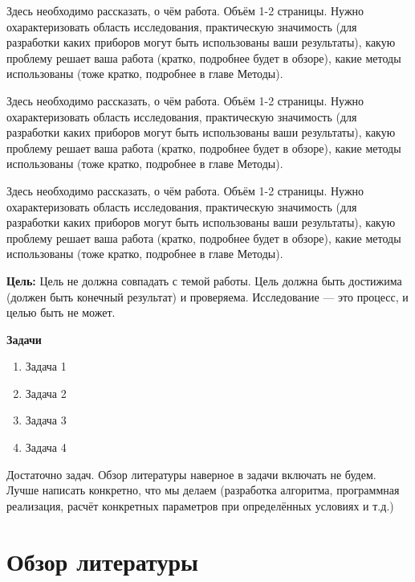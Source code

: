 \documentclass[a4paper,14pt]{extarticle}
\begin{document}


\tableofcontents
\pagebreak


Здесь необходимо рассказать, о чём работа. Объём 1-2 страницы. Нужно охарактеризовать область исследования, практическую значимость (для разработки каких приборов могут быть использованы ваши результаты), какую проблему решает ваша работа (кратко, подробнее будет в обзоре), какие методы использованы (тоже кратко, подробнее в главе Методы).

Здесь необходимо рассказать, о чём работа. Объём 1-2 страницы. Нужно охарактеризовать область исследования, практическую значимость (для разработки каких приборов могут быть использованы ваши результаты), какую проблему решает ваша работа (кратко, подробнее будет в обзоре), какие методы использованы (тоже кратко, подробнее в главе Методы).

Здесь необходимо рассказать, о чём работа. Объём 1-2 страницы. Нужно охарактеризовать область исследования, практическую значимость (для разработки каких приборов могут быть использованы ваши результаты), какую проблему решает ваша работа (кратко, подробнее будет в обзоре), какие методы использованы (тоже кратко, подробнее в главе Методы).

\label{Tasks}

\textbf{Цель:} Цель не должна совпадать с темой работы. Цель должна быть достижима (должен быть конечный результат) и проверяема. Исследование --- это процесс, и целью быть не может.

\textbf{Задачи}
\begin{enumerate}
    \item Задача 1
    \item Задача 2
    \item Задача 3
    \item Задача 4
\end{enumerate}

Достаточно задач. Обзор литературы наверное в задачи включать не будем. Лучше написать конкретно, что мы делаем (разработка алгоритма, программная реализация, расчёт конкретных параметров при определённых условиях и т.д.)

\pagebreak
\section{Обзор литературы}
\end{document}
